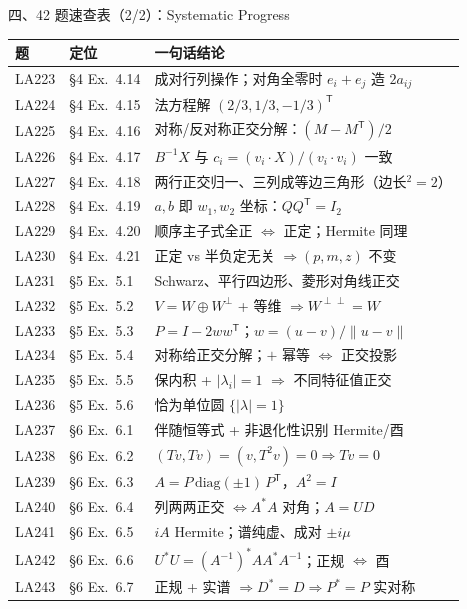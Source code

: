 \documentclass[aspectratio=169,10pt,fontset=none]{ctexbeamer}
\begin{document}
\begin{frame}[t]{四、42 题速查表（2/2）：Systematic Progress}
  \centering\scriptsize
  \setlength{\tabcolsep}{2.5pt}
  \renewcommand{\arraystretch}{0.95}
  \begin{tabular}{@{}l l l@{}}
    \toprule
    题 & 定位 & 一句话结论\\
    \midrule
    LA223 & \S4 Ex.~4.14 & 成对行列操作；对角全零时 $e_i{+}e_j$ 造 $2a_{ij}$\\
    LA224 & \S4 Ex.~4.15 & 法方程解 $(2/3,1/3,-1/3)^{\mathsf T}$\\
    LA225 & \S4 Ex.~4.16 & 对称/反对称正交分解：$(M{-}M^{\mathsf T})/2$\\
    LA226 & \S4 Ex.~4.17 & $B^{-1}X$ 与 $c_i=(v_i{\cdot}X)/(v_i{\cdot}v_i)$ 一致\\
    LA227 & \S4 Ex.~4.18 & 两行正交归一、三列成等边三角形（边长$^2=2$）\\
    LA228 & \S4 Ex.~4.19 & $a,b$ 即 $w_1,w_2$ 坐标：$QQ^{\mathsf T}=I_2$\\
    LA229 & \S4 Ex.~4.20 & 顺序主子式全正 $\iff$ 正定；Hermite 同理\\
    LA230 & \S4 Ex.~4.21 & 正定 vs 半负定无关 $\Rightarrow(p,m,z)$ 不变\\
    LA231 & \S5 Ex.~5.1 & Schwarz、平行四边形、菱形对角线正交\\
    LA232 & \S5 Ex.~5.2 & $V=W\oplus W^\perp$ + 等维 $\Rightarrow W^{\perp\perp}=W$\\
    LA233 & \S5 Ex.~5.3 & $P=I-2ww^{\mathsf T}$；$w=(u{-}v)/\lVert u{-}v\rVert$\\
    LA234 & \S5 Ex.~5.4 & 对称给正交分解；$+$ 幂等 $\iff$ 正交投影\\
    LA235 & \S5 Ex.~5.5 & 保内积 + $|\lambda_i|=1$ $\Rightarrow$ 不同特征值正交\\
    LA236 & \S5 Ex.~5.6 & 恰为单位圆 $\{|\lambda|=1\}$\\
    LA237 & \S6 Ex.~6.1 & 伴随恒等式 + 非退化性识别 Hermite/酉\\
    LA238 & \S6 Ex.~6.2 & $(Tv,Tv)=(v,T^2v)=0\Rightarrow Tv=0$\\
    LA239 & \S6 Ex.~6.3 & $A=P\,\mathrm{diag}(\pm1)\,P^{\mathsf T}$，$A^2=I$\\
    LA240 & \S6 Ex.~6.4 & 列两两正交 $\iff A^*A$ 对角；$A=UD$\\
    LA241 & \S6 Ex.~6.5 & $iA$ Hermite；谱纯虚、成对 $\pm i\mu$\\
    LA242 & \S6 Ex.~6.6 & $U^*U=(A^{-1})^*AA^*A^{-1}$；正规 $\iff$ 酉\\
    LA243 & \S6 Ex.~6.7 & 正规 + 实谱 $\Rightarrow D^*=D\Rightarrow P^*=P$ 实对称\\
    \bottomrule
  \end{tabular}
\end{frame}
\end{document}
